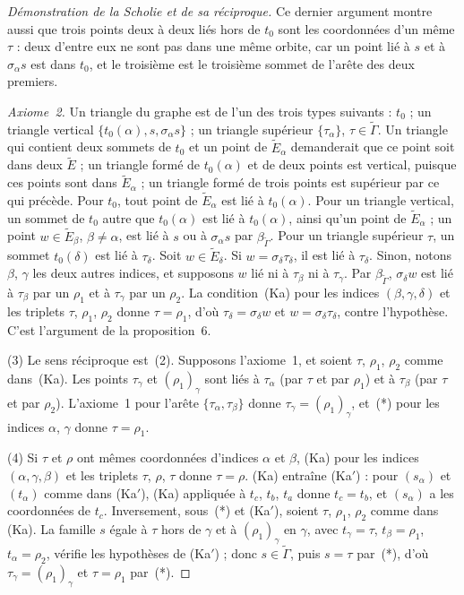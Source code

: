 \begin{proof}[Démonstration de la Scholie et de sa réciproque]
Ce dernier argument montre aussi que trois points deux à deux liés hors de $t_0$ sont les coordonnées d'un même $\tau$ : deux d'entre eux ne sont pas dans une même orbite, car un point lié à $s$ et à $\sigma_\alpha s$ est dans $t_0$, et le troisième est le troisième sommet de l'arête des deux premiers.

\emph{Axiome~2.} Un triangle du graphe est de l'un des trois types suivants : $t_0$ ; un triangle vertical $\{t_0(\alpha), s, \sigma_\alpha s\}$ ; un triangle supérieur $\{\tau_\alpha\}$, $\tau \in \widetilde\Gamma$. Un triangle qui contient deux sommets de $t_0$ et un point de $\widetilde E_\alpha$ demanderait que ce point soit dans deux $\widetilde E$ ; un triangle formé de $t_0(\alpha)$ et de deux points est vertical, puisque ces points sont dans $\widetilde E_\alpha$ ; un triangle formé de trois points est supérieur par ce qui précède. Pour $t_0$, tout point de $\widetilde E_\alpha$ est lié à $t_0(\alpha)$. Pour un triangle vertical, un sommet de $t_0$ autre que $t_0(\alpha)$ est lié à $t_0(\alpha)$, ainsi qu'un point de $\widetilde E_\alpha$ ; un point $w \in \widetilde E_\beta$, $\beta \neq \alpha$, est lié à $s$ ou à $\sigma_\alpha s$ par $\beta_{\widetilde\Gamma}$. Pour un triangle supérieur $\tau$, un sommet $t_0(\delta)$ est lié à $\tau_\delta$. Soit $w \in \widetilde E_\delta$. Si $w = \sigma_\delta \tau_\delta$, il est lié à $\tau_\delta$. Sinon, notons $\beta$, $\gamma$ les deux autres indices, et supposons $w$ lié ni à $\tau_\beta$ ni à $\tau_\gamma$. Par $\beta_{\widetilde\Gamma}$, $\sigma_\delta w$ est lié à $\tau_\beta$ par un $\rho_1$ et à $\tau_\gamma$ par un $\rho_2$. La condition~(Ka) pour les indices $(\beta, \gamma, \delta)$ et les triplets $\tau$, $\rho_1$, $\rho_2$ donne $\tau = \rho_1$, d'où $\tau_\delta = \sigma_\delta w$ et $w = \sigma_\delta \tau_\delta$, contre l'hypothèse. C'est l'argument de la proposition~6.

(3) Le sens réciproque est~(2). Supposons l'axiome~1, et soient $\tau$, $\rho_1$, $\rho_2$ comme dans~(Ka). Les points $\tau_\gamma$ et $(\rho_1)_\gamma$ sont liés à $\tau_\alpha$ (par $\tau$ et par $\rho_1$) et à $\tau_\beta$ (par $\tau$ et par $\rho_2$). L'axiome~1 pour l'arête $\{\tau_\alpha, \tau_\beta\}$ donne $\tau_\gamma = (\rho_1)_\gamma$, et~(*) pour les indices $\alpha$, $\gamma$ donne $\tau = \rho_1$.

(4) Si $\tau$ et $\rho$ ont mêmes coordonnées d'indices $\alpha$ et $\beta$, (Ka) pour les indices $(\alpha, \gamma, \beta)$ et les triplets $\tau$, $\rho$, $\tau$ donne $\tau = \rho$. (Ka) entraîne (Ka$'$) : pour $(s_\alpha)$ et $(t_\alpha)$ comme dans (Ka$'$), (Ka) appliquée à $t_c$, $t_b$, $t_a$ donne $t_c = t_b$, et $(s_\alpha)$ a les coordonnées de $t_c$. Inversement, sous~(*) et (Ka$'$), soient $\tau$, $\rho_1$, $\rho_2$ comme dans (Ka). La famille $s$ égale à $\tau$ hors de $\gamma$ et à $(\rho_1)_\gamma$ en $\gamma$, avec $t_\gamma = \tau$, $t_\beta = \rho_1$, $t_\alpha = \rho_2$, vérifie les hypothèses de (Ka$'$) ; donc $s \in \widetilde\Gamma$, puis $s = \tau$ par~(*), d'où $\tau_\gamma = (\rho_1)_\gamma$ et $\tau = \rho_1$ par~(*).
\end{proof}

